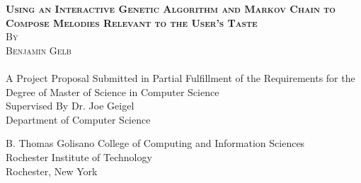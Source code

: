 \documentclass[12pt]{article} %
\begin{document}

\begin{titlepage}

\newcommand{\HRule}{\rule{\linewidth}{0.5mm}} %

\center %

\textsc{\LARGE \bfseries Using an Interactive Genetic Algorithm and Markov Chain to Compose Melodies Relevant to the User's Taste}\\[1.5cm]
\textsc{\large By}\\[0.5cm] %
\textsc{\large Benjamin Gelb}\\[0.5cm] %
\textsc{}\\[0.5cm]
{\large A Project Proposal Submitted in Partial Fulﬁllment of the Requirements for the Degree of Master of Science in Computer Science}\\[1.5cm] %
{\large Supervised By Dr. Joe Geigel \\ Department of Computer Science}\\[1.5cm] %
{\large
 
B. Thomas Golisano College of Computing and Information Sciences \\
Rochester Institute of Technology  \\
Rochester, New York 
}\\[1.5cm]





\end{titlepage}
\end{document}
